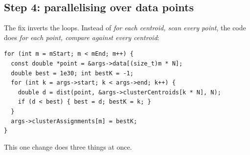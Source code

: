 \documentclass[11pt,a4paper]{article}
\begin{document}
\subsection{Step 4: parallelising over data points}
\label{sec:p6interchange}

The fix inverts the loops. Instead of \emph{for each centroid, scan every
point}, the code does \emph{for each point, compare against every centroid}:

\begin{verbatim}
for (int m = mStart; m < mEnd; m++) {
  const double *point = &args->data[(size_t)m * N];
  double best = 1e30; int bestK = -1;
  for (int k = args->start; k < args->end; k++) {
    double d = dist(point, &args->clusterCentroids[k * N], N);
    if (d < best) { best = d; bestK = k; }
  }
  args->clusterAssignments[m] = bestK;
}
\end{verbatim}

This one change does three things at once.
\end{document}

